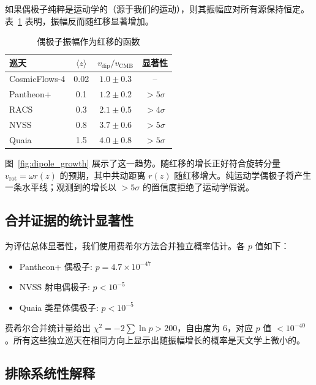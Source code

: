 \documentclass[11pt,a4paper]{article}
\begin{document}
	如果偶极子纯粹是运动学的（源于我们的运动），则其振幅应对所有源保持恒定。表~\ref{tab:dipole_amplitudes} 表明，振幅反而随红移显著增加。
	
	\begin{table}[htbp]
		\centering
		\caption{偶极子振幅作为红移的函数}
		\label{tab:dipole_amplitudes}
		\begin{tabular}{lccc}
			\toprule
			\textbf{巡天} & \(\langle z \rangle\) & \(v_{\text{dip}}/v_{\text{CMB}}\) & \textbf{显著性} \\
			\midrule
			CosmicFlows-4 & 0.02 & \(1.0 \pm 0.3\) & -- \\
			Pantheon+ & 0.1 & \(1.2 \pm 0.2\) & \(>5\sigma\) \cite{Sah2025} \\
			RACS & 0.3 & \(2.1 \pm 0.5\) & \(>4\sigma\) \cite{Oayda2024} \\
			NVSS & 0.8 & \(3.7 \pm 0.6\) & \(>5\sigma\) \cite{Singal2024} \\
			Quaia & 1.5 & \(4.0 \pm 0.8\) & \(>5\sigma\) \cite{Secrest2025} \\
			\bottomrule
		\end{tabular}
	\end{table}
	
	图~\ref{fig:dipole_growth} 展示了这一趋势。随红移的增长正好符合旋转分量 \(v_{\mathrm{rot}} = \omega r(z)\) 的预期，其中共动距离 \(r(z)\) 随红移增大。纯运动学偶极子将产生一条水平线；观测到的增长以 \(>5\sigma\) 的置信度拒绝了运动学假说。
	
	\subsection{合并证据的统计显著性}
	
	为评估总体显著性，我们使用费希尔方法合并独立概率估计。各 \(p\) 值如下：
	\begin{itemize}
		\item Pantheon+ 偶极子: \(p = 4.7\times10^{-47}\) \cite{Sah2025}
		\item NVSS 射电偶极子: \(p < 10^{-5}\) \cite{Singal2024}
		\item Quaia 类星体偶极子: \(p < 10^{-5}\) \cite{Secrest2025}
	\end{itemize}
	费希尔合并统计量给出 \(\chi^2 = -2\sum \ln p > 200\)，自由度为 6，对应 \(p\) 值 \(< 10^{-40}\)。所有这些独立巡天在相同方向上显示出随振幅增长的概率是天文学上微小的。
	
	\subsection{排除系统性解释}
	
\end{document}
